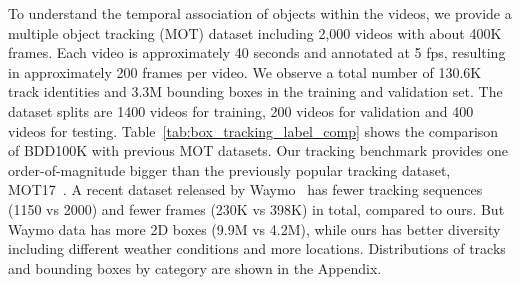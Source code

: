To understand the temporal association of objects within the videos, we provide a multiple object tracking (MOT) dataset including 2,000 videos with about 400K frames. Each video is approximately 40 seconds and annotated at 5 fps, resulting in approximately 200 frames per video. We observe a total number of 130.6K track identities and 3.3M bounding boxes in the training and validation set. The dataset splits are 1400 videos for training, 200 videos for validation and 400 videos for testing. Table~\ref{tab:box_tracking_label_comp} shows the comparison of BDD100K with previous MOT datasets. Our tracking benchmark provides one order-of-magnitude bigger than the previously popular tracking dataset, MOT17~\cite{mot16}. A recent dataset released by Waymo~\cite{waymo_2019} has fewer tracking sequences (1150 vs 2000) and fewer frames (230K vs 398K) in total, compared to ours. But Waymo data has more 2D boxes (9.9M vs 4.2M), while ours has better diversity including different weather conditions and more locations. Distributions of tracks and bounding boxes by category are shown in the Appendix.


\begin{table}[htp]
\centering
{}
\caption{\small MOT datasets statistics of training and validation sets. Our dataset has more sequences, frames, identities as well as more box annotations.\vspace{-2mm}}
    \label{tab:box_tracking_label_comp}
\end{table}

